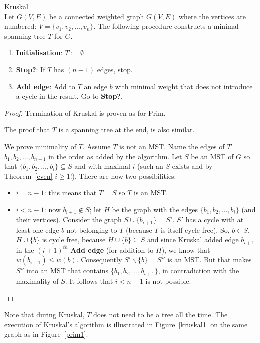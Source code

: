\begin{code} Kruskal \label{kruskal}\\
  Let $G(V,E)$ be a connected weighted graph $G(V,E)$ where the
vertices are numbered: $V = \{v_{1},v_{2},\ldots,v_{n}\}$. The
following procedure constructs a minimal spanning tree $T$ for $G$.
\begin{enumerate}
\item \textbf{Initialisation}: $T := \emptyset$
\item \textbf{Stop?}: If $T$ has $(n-1)$ edges, stop.
\item \textbf{Add edge}: Add to $T$ an edge $b$ with minimal weight
  that does not introduce a cycle in the result. Go to {\bf Stop?}.
\end{enumerate}
\end{code}
\begin{proof}
Termination of Kruskal is proven as for Prim.

The proof that $T$ is a spanning tree at the end, is also similar.

We prove minimality of $T$. Assume $T$ is not an MST.  Name the edges
of $T$ $b_{1},b_{2},\ldots ,b_{n-1}$ in the order as added by the
algorithm. Let $S$ be an MST of $G$ so that
%
$\{b_{1}, b_{2}, \ldots , b_{i}\} \subseteq S$ and with maximal $i$
(such an $S$ exists and by Theorem~\ref{even} $i \geq 1$!). There are
now two possibilities:
\begin{itemize}
\item
\textbf{$i = n-1$}: this means that $T = S$ so $T$ is an MST.
\item
\textbf{$i < n-1$}: now $b_{i+1} \notin S$; let $H$ be the graph with
the edges $\{b_{1}, b_{2}, \ldots , b_{i}\}$ (and their
vertices). Consider the graph $S \cup \{b_{i+1}\} = S'$. $S'$ has a
cycle with at least one edge $b$ not belonging to $T$ (because $T$ is
itself cycle free). So, $b \in S$. $H \cup \{b\}$ is cycle free,
because $H \cup \{b\} \subseteq S$ and since Kruskal added edge
$b_{i+1}$ in the $(i+1)^{th}$ \textbf{Add edge} (for addition to $H$),
we know that $w(b_{i+1}) \leq w(b)$. Consequently $S' \backslash \{b\}
= S''$ is an MST. But that makes $S''$ into an MST that contains
$\{b_{1}, b_{2}, \ldots , b_{i+1}\}$, in contradiction with the
maximality of $S$. It follows that $i < n-1$ is not possible.
\end{itemize}
\end{proof}

Note that during Kruskal, $T$ does not need to be a tree all the
time. The execution of Kruskal's algorithm is illustrated in
Figure~\ref{kruskal1} on the same graph as in Figure~\ref{prim1}.

